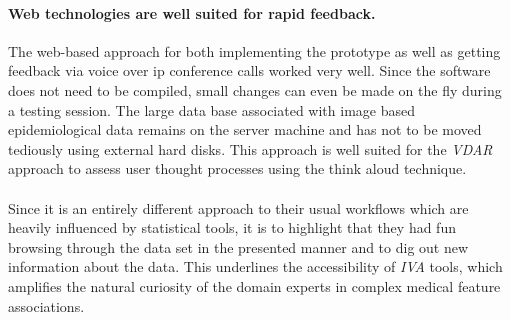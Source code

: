 \documentclass[journal]{style/vgtc} 			          %
\newcommand{\com}[1]{\textcolor{orange}{\uline{#1}}}
\begin{document}
\paragraph{Web technologies are well suited for rapid feedback.}
The web-based approach for both implementing the prototype as well as getting feedback via voice over ip conference calls worked very well.
%
Since the software does not need to be compiled, small changes can even be made on the fly during a testing session.
%
The large data base associated with image based epidemiological data remains on the server machine and has not to be moved tediously using external hard disks.
%
This approach is well suited for the \emph{VDAR} approach to assess user thought processes using the think aloud technique.
\\\\
Since it is an entirely different approach to their usual workflows which are heavily influenced by statistical tools, it is to highlight that they had fun browsing through the data set in the presented manner and to dig out new information about the data.
%
This underlines the accessibility of \emph{IVA} tools, which amplifies the natural curiosity of the domain experts in complex medical feature associations.
%
\end{document}
